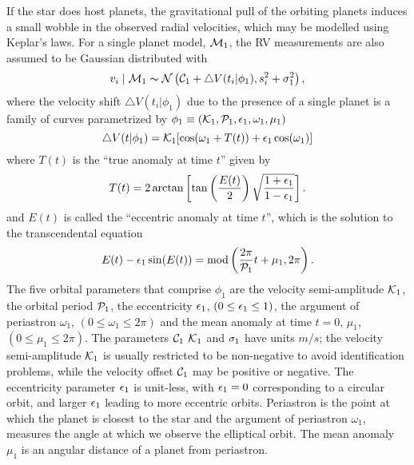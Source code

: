 If the star  does host planets, the gravitational pull of the orbiting
planets induces a small wobble in the observed radial velocities,
which may be modelled using Keplar's laws.
For a single planet model, $\M_1$, the RV measurements are also
assumed to be Gaussian distributed  with
\begin{equation}\label{Velocity_Model}
v_i \mid \M_1 \ind \N \left(\C_1 +\bigtriangleup
V(t_i|\phi_1),\s_i^2+\sj_1^2\right),
\end{equation}
where the velocity shift $\bigtriangleup
V(t_i|\phi_1)$ due to the presence of a single planet is
a  family of curves parametrized by 
$\phi_1 \equiv (\K_1,\P_1,\e_1,\omega_1,\mu_1)$
\begin{equation}\label{Velocity_1p_Model}
\bigtriangleup V(t|\phi_1)=\K_1[\cos(\omega_1+T(t))+\e_1 \cos(\omega_1)]
\end{equation}
where $T(t)$ is the ``true anomaly at time $t$'' given by
\begin{equation}\label{true_anomaly}
T(t)=2\arctan\left[\tan\left(\frac{E(t)}{2}\right)\sqrt{\frac{1+\e_1}{1-\e_1}}\right].
\end{equation}
and $E(t)$ is called the ``eccentric anomaly at time $t$'', which is the
solution to the transcendental equation
\begin{equation}\label{transcendental_equation}
E(t)-\e_1\sin(E(t))=\mbox{mod}\left(\frac{2\pi}{\P_1}t+\mu_1,2\pi\right).
\end{equation}
The five orbital parameters that comprise $\phi_1$ are the velocity
semi-amplitude $\K_1$, the orbital period $\P_1$, the eccentricity
$\e_1$, $(0\leq \e_1 \le 1)$, the argument of periastron $\omega_1$,
$(0\le \omega_1 \le 2\pi)$ and the mean anomaly at time $t=0$,
$\mu_1$, $(0\le \mu_1 \le 2\pi)$.  The parameters $\C_1$ $\K_1$ and
$\sj_1$ have units $m/s$; the velocity semi-amplitude $\K_1$ is
usually restricted to be non-negative to avoid identification
problems, while the velocity offset $\C_1$ may be positive or
negative.  The eccentricity parameter $\e_1$ is unit-less, with $\e_1
= 0$ corresponding to a circular orbit, and larger $\e_1$ leading to
more eccentric orbits. Periastron is the point at which the planet is
closest to the star and the argument of periastron $\omega_1$,
measures the angle at which we observe the elliptical orbit.  The mean
anomaly $\mu_1$ is an angular distance of a planet from periastron.


